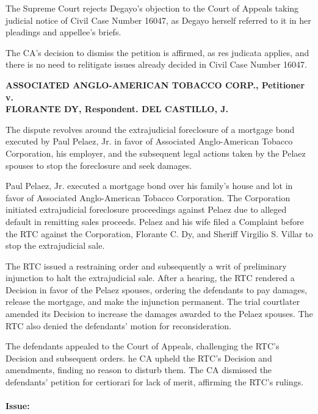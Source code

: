 \documentclass[
12pt,
oneside,
onehalfspacing,
headsepline
]{DigestCollection}
\begin{document}
The Supreme Court rejects Degayo's objection to the Court of Appeals taking judicial notice of Civil Case Number 16047, as Degayo herself referred to it in her pleadings and appellee's briefs.

The CA's decision to dismiss the petition is affirmed, as res judicata applies, and there is no need to relitigate issues already decided in Civil Case Number 16047.

\label{4fb499e0-0a1d-11ef-932c-63c852f65e48}


\noindent\textbf{ASSOCIATED ANGLO-AMERICAN TOBACCO CORP., Petitioner v. \\FLORANTE DY, Respondent. DEL CASTILLO, J.}\vspace{0.4cm}

The dispute revolves around the extrajudicial foreclosure of a mortgage bond executed by Paul Pelaez, Jr. in favor of Associated Anglo-American Tobacco Corporation, his employer, and the subsequent legal actions taken by the Pelaez spouses to stop the foreclosure and seek damages.

Paul Pelaez, Jr. executed a mortgage bond over his family's house and lot in favor of Associated Anglo-American Tobacco Corporation. The Corporation initiated extrajudicial foreclosure proceedings against Pelaez due to alleged default in remitting sales proceeds. Pelaez and his wife filed a Complaint before the RTC against the Corporation, Florante C. Dy, and Sheriff Virgilio S. Villar to stop the extrajudicial sale.

The RTC issued a restraining order and subsequently a writ of preliminary injunction to halt the extrajudicial sale. After a hearing, the RTC rendered a Decision in favor of the Pelaez spouses, ordering the defendants to pay damages, release the mortgage, and make the injunction permanent. The trial courtlater amended its Decision to increase the damages awarded to the Pelaez spouses. The RTC also denied the defendants' motion for reconsideration.

The defendants appealed to the Court of Appeals, challenging the RTC's Decision and subsequent orders. he CA upheld the RTC's Decision and amendments, finding no reason to disturb them. The CA dismissed the defendants' petition for certiorari for lack of merit, affirming the RTC's rulings.

\paragraph{Issue:}
\label{8c0267b0-1256-11ef-aa24-9916ea601717}
\end{document}
